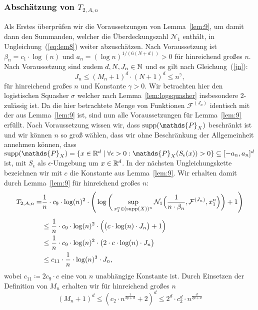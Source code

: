 \subsubsection{Abschätzung von $T_{2,A,n}$}
Als Erstes überprüfen wir die Voraussetzungen von Lemma~\ref{lem:9}, um damit dann den Summanden, welcher die Überdeckungszahl $\mathcal{N}_1$ enthält, in Ungleichung~(\ref{eq:lem8}) weiter abzuschätzen.
Nach Voraussetzung ist $\beta_n = c_1 \cdot \log(n)$ und $a_n = (\log n)^{1/(6(N + d))} > 0$ für hinreichend großes $n$. Nach Voraussetzung sind zudem $d, N, J_n \in \mathbb{N}$ und es gilt nach Gleichung~(\ref{jn}): 
$$J_n \leq (M_n + 1)^d \cdot (N + 1)^d \leq n^{\gamma},$$
für hinreichend großes $n$ und Konstante $\gamma > 0$. Wir betrachten hier den logistischen Squasher $\sigma$ welcher nach Lemma~\ref{lem:logsquasher} insbesondere 2-zulässig ist. Da die hier betrachtete Menge von Funktionen $\mathcal{F}^{(J_n)}$ identisch mit der aus Lemma~\ref{lem:9} ist, sind nun alle Voraussetzungen für Lemma~\ref{lem:9} erfüllt. Nach Voraussetzung wissen wir, dass $\supp(\mathds{P}_X)$ beschränkt ist und wir können $n$ so groß wählen, dass wir ohne Beschränkung der Allgemeinheit annehmen können, dass $\supp(\mathds{P}_X) = \{x \in \R^d \mid \forall \epsilon > 0 : \mathds{P}_X(S_{\epsilon}(x)) > 0\} \subseteq [-a_n, a_n]^d$ ist, mit $S_{\epsilon}$ als $\epsilon$-Umgebung um $x \in \mathbb{R}^d$. In der nächsten Ungleichungskette bezeichnen wir mit $c$ die Konstante aus Lemma~\ref{lem:9}. Wir erhalten damit durch Lemma~\ref{lem:9} für hinreichend großes $n$:
\begin{equation}
\label{lem9sol}
\begin{split}
T_{2,A,n} = & \frac{1}{n} \cdot c_9 \cdot \log(n)^2 \cdot \Bigg(\log\bigg(\sup_{x_1^n \in (\operatorname{supp}(X))^n}\mathcal{N}_1\Big(\frac{1}{n \cdot \beta_n},\mathcal{F}^{(J_n)},x_1^n\Big)\bigg) + 1\Bigg) \\[0.5em]
& \leq \frac{1}{n} \cdot c_9 \cdot \log(n)^2 \cdot \Big(\big(c \cdot \log(n) \cdot J_n \big) + 1\Big) \\
& \leq \frac{1}{n} \cdot c_9 \cdot \log(n)^2 \cdot \big(2 \cdot c \cdot \log(n) \cdot J_n\big) \\
& \leq c_{11} \cdot \frac{1}{n} \cdot \log(n)^3 \cdot J_n,
\end{split}
\end{equation}
wobei $c_{11} \coloneqq 2 c_9 \cdot c$ eine von $n$ unabhängige Konstante ist.
Durch Einsetzen der Definition von $M_n$ erhalten wir für hinreichend großes $n$ 
$$
(M_n + 1)^d \leq (c_2 \cdot n^{\frac{1}{2p + d}} + 2)^d \leq 2^d \cdot c_2^d \cdot n^{\frac{d}{2p + d}}
$$
